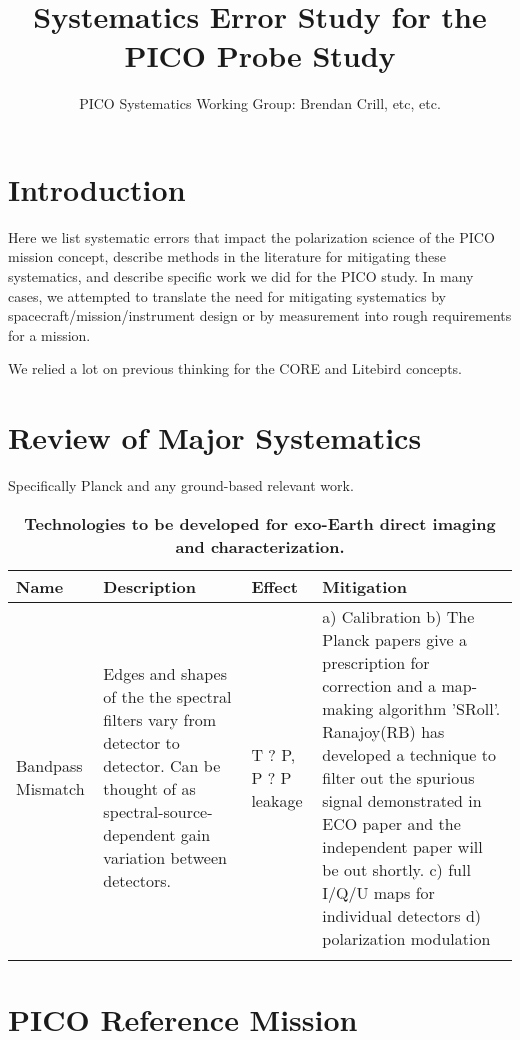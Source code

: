 \documentclass[12pt]{article}
\title{Systematics Error Study for the PICO Probe Study}
\author{PICO Systematics Working Group: Brendan Crill, etc, etc.}
\begin{document}


  \maketitle 

\section{Introduction}

Here we list systematic errors that impact the polarization science of the PICO mission concept, describe methods in the literature for mitigating these systematics, and describe specific work we did for the PICO study.  In many cases, we attempted to translate the need for mitigating systematics by spacecraft/mission/instrument design or by measurement into rough requirements for a mission.

We relied a lot on previous thinking for the CORE and Litebird concepts.

\section{Review of Major Systematics}

Specifically Planck\cite{Planck_LowEll} and any ground-based relevant work.
\begin{center}
 \begin{longtable}{K{3cm} L{4.3cm} L{4.3cm} L{4.3cm}}
 \hline
\textbf{Name} & Description & Effect & Mitigation \\
 \hline
 \endhead
 Bandpass Mismatch & 
 Edges and shapes of the the spectral filters vary from detector to detector. Can be thought of as spectral-source-dependent gain variation between detectors. &
 T ? P, P ? P leakage &
 a) Calibration 
b) The Planck papers give a prescription for correction and a map-making algorithm 'SRoll'. Ranajoy(RB) has developed a technique to filter out the spurious signal demonstrated in ECO paper and the independent paper will be out shortly. 
c) full I/Q/U maps for individual detectors 
d) polarization modulation \\
  
 
 \hline
 \caption{\label{tbl:TechnologyGaps} \textbf{Technologies to be developed for exo-Earth direct imaging and characterization.}}
 \end{longtable}
 \end{center}

\section{PICO Reference Mission}
\end{document}
